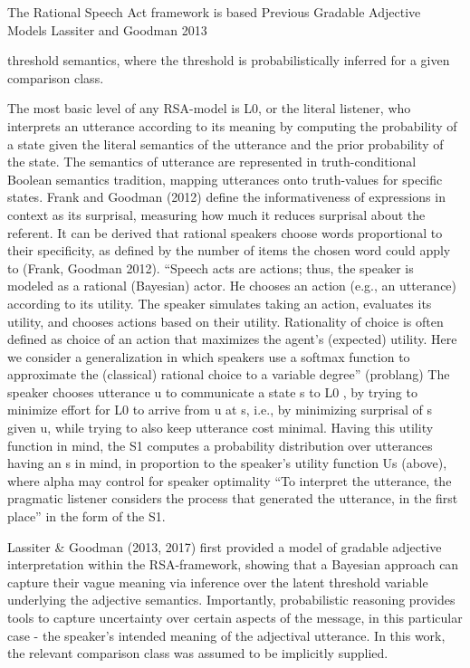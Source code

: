The Rational Speech Act framework is based 
Previous Gradable Adjective Models
Lassiter and Goodman 2013

threshold semantics, where the threshold is probabilistically inferred \parencite{lassiter2017adjectival} for a given comparison class.

The most basic level of any RSA-model is L0, or the literal listener, who interprets an utterance according to its meaning by computing the probability of a state given the literal semantics of the utterance and the prior probability of the state.  The semantics of utterance are represented in truth-conditional Boolean semantics tradition, mapping utterances onto truth-values for specific states. Frank and Goodman (2012) define the informativeness of expressions in context as its surprisal, measuring how much it reduces surprisal about the referent. It can be derived that rational speakers choose words proportional to their specificity, as defined by the number of items the chosen word could apply to (Frank, Goodman 2012).   
“Speech acts are actions; thus, the speaker is modeled as a rational (Bayesian) actor. He chooses an action (e.g., an utterance) according to its utility. The speaker simulates taking an action, evaluates its utility, and chooses actions based on their utility. Rationality of choice is often defined as choice of an action that maximizes the agent’s (expected) utility. Here we consider a generalization in which speakers use a softmax function to approximate the (classical) rational choice to a variable degree” (problang)
The speaker chooses utterance u to communicate a state s to L0 , by trying to minimize effort for L0 to arrive from u at s, i.e., by minimizing surprisal of s given u, while trying to also keep utterance cost minimal. Having this utility function in mind, the S1 computes a probability distribution over utterances having an s in mind, in proportion to the speaker’s utility function Us (above), where alpha may control for speaker optimality  
“To interpret the utterance, the pragmatic listener considers the process that generated the utterance, in the first place” in the form of the S1. 

Lassiter \& Goodman (2013, 2017) first provided a model of gradable adjective interpretation within the RSA-framework, showing that a Bayesian approach can capture their vague meaning via inference over the latent threshold variable underlying the adjective semantics. Importantly, probabilistic reasoning provides tools to capture uncertainty over certain aspects of the message, in this particular case - the speaker’s intended meaning of the adjectival utterance.  
In this work, the relevant comparison class was assumed to be implicitly supplied. 

